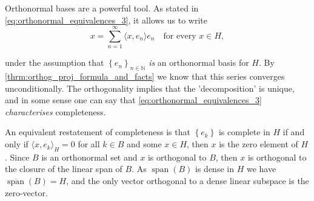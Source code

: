 \documentclass[../thesis.tex]{subfiles}
\begin{document}



Orthonormal bases are a powerful tool. As stated in \cref{eq:orthonormal_equivalences_3}, it allows us to write
\begin{equation*}
    x= \sum_{n=1}^{\infty} \langle x, e_n \rangle e_n \quad \text{for every } x\in H,
\end{equation*}

under the assumption that $\left\{ e_{n} \right\}_{n\in \mathbb{N}}$ \emph{is} an orthonormal basis for $H$.  By \cref{thrm:orthog_proj_formula_and_facts} we know that this series converges unconditionally. The orthogonality implies that the 'decomposition' is unique, and in some sense one can say that \cref{eq:orthonormal_equivalences_3} \emph{characterises} completeness. %

An equivalent restatement of completeness is that $\left\{ e_k \right\}$ is complete in $H$ if and only if $\langle x, e_k \rangle_{H} = 0$ for all $k\in B$ and some $x\in H$, then $x$ is the zero element of $H$. Since $B$ is an orthonormal set and $x$ is orthogonal to $B$, then $x$ is orthogonal to the closure of the linear span of $B$. As $\operatorname{span}(B)$ is dense in $H$ we have $\overline{\operatorname{span}}(B) = H$, and the only vector orthogonal to a dense linear subspace is the zero-vector. 




\end{document}
